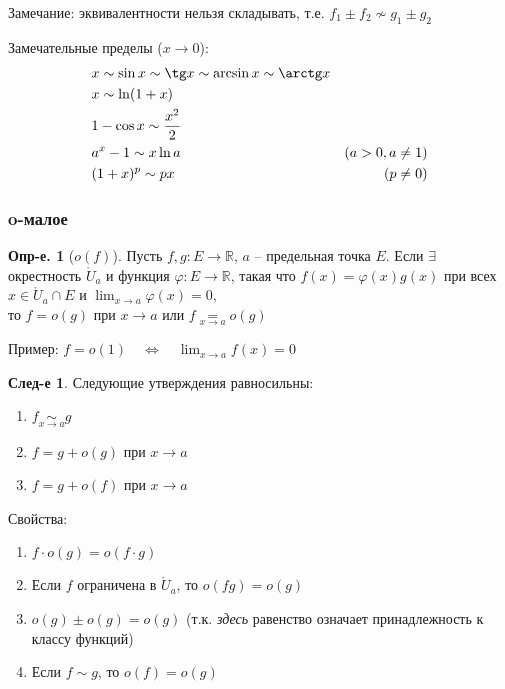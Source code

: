 \documentclass[a4paper,12pt]{article}
\numberwithin{figure}{section}
\theoremstyle{definition}
\newtheorem{definition}{Опр-е.}[section]
\theoremstyle{definition}
\newtheorem*{corollary}{След-е} %
\def\DS{\displaystyle}
\def\RR{\mathbb{R}}
\def\on{\!:}
\def\ringU{\mathring{U}}
\begin{document}
Замечание: эквивалентности нельзя складывать, т.е. $f_1 \pm f_2 \not\sim g_1 \pm g_2$

\bigskip
Замечательные пределы ($x\to0$):
\begin{align*}
	   & x \sim \sin x \sim \tg x \sim \arcsin x \sim \arctg x
	\\ & x \sim \ln(1+x)
	\\ & 1 - \cos x \sim \frac{x^2}2
	\\ & a^x-1 \sim x \ln a		& (a>0, a\ne1)
	\\ & (1+x)^p \sim px		& (p\ne0)
\end{align*}


\subsubsection{o-малое}

\begin{definition}[$o(f)$]
	Пусть $f,g\on E\to\RR$, $a$ -- предельная точка $E$.
	Если $\exists$ окрестность $\ringU_a$ и функция $\varphi\on E\to\RR$,
	такая что $f(x)=\varphi(x)g(x)$ при всех $x\in\ringU_a\cap E$
	и $\DS \lim_{x\to a}\varphi(x)=0$,\\
	то $f = o(g)$ при $x\to a$ или $\DS f \underset{x\to a}{=} o(g)$
\end{definition}

\medskip
Пример: $\DS f=o(1) \quad \Longleftrightarrow \quad \lim_{x\to a}f(x)=0$
\medskip

\begin{corollary}
	Следующие утверждения равносильны: \begin{enumerate}
		\item $\DS f \underset{x\to a}\sim g$
		\item $f=g+o(g)$ при $x\to a$
		\item $f=g+o(f)$ при $x\to a$
	\end{enumerate}
\end{corollary}

\medskip
Свойства:
\begin{enumerate}
	\item $f \cdot o(g) = o(f \cdot g)$
	\item Если $f$ ограничена в $\ringU_a$, то $o(fg)=o(g)$
	\item $o(g) \pm o(g) = o(g)$ \medspace
		  {\small (т.к. \textit{здесь} равенство означает принадлежность к классу функций)}
	\item Если $f \sim g$, то $o(f)=o(g)$
\end{enumerate}
\end{document}
